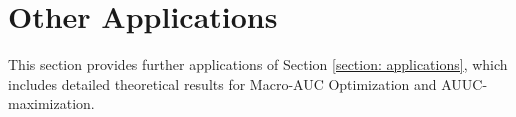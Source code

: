 \documentclass{article}
\newtheorem{theorem}{Theorem}
\begin{document}
\section{Other Applications} \label{section: E}
This section provides further applications of Section \ref{section: applications}, which includes detailed theoretical results for Macro-AUC Optimization and AUUC-maximization.


    

\end{document}
